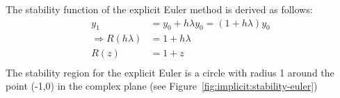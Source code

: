 \begin{example}
  The stability function of the explicit Euler method is derived as follows:
  \begin{equation}\begin{split}
      \label{eq:impl:stabil:expleuler}
      y_1 &= y_0 + h \lambda y_0 = (1 + h \lambda) y_0 \\
      \Rightarrow R(h \lambda) &= 1 + h \lambda \\
      R(z) &= 1 + z \\
    \end{split}\end{equation}
  The stability region for the explicit Euler is a circle with radius
  1 around the point (-1,0) in the complex plane (see Figure~\ref{fig:implicit:stability-euler})
\end{example}


